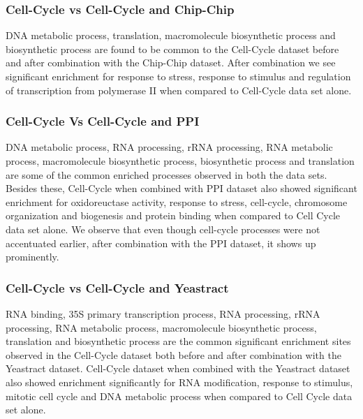 \subsubsection{Cell-Cycle vs Cell-Cycle and Chip-Chip}

DNA metabolic process, translation, macromolecule biosynthetic process and biosynthetic process are found to be common to the Cell-Cycle dataset before and after combination with the 
Chip-Chip dataset. After combination we see significant enrichment for response to stress, response to stimulus and regulation of transcription from polymerase II when compared 
to Cell-Cycle data set alone.

\subsubsection{Cell-Cycle Vs Cell-Cycle and PPI}

DNA metabolic process, RNA processing, rRNA processing, RNA metabolic process, macromolecule biosynthetic process, biosynthetic process and translation are 
some of the common enriched processes observed in both the data sets. Besides these, Cell-Cycle when combined with PPI dataset also showed significant enrichment for 
oxidoreuctase activity, response to stress, cell-cycle, chromosome organization and biogenesis and protein binding when compared to Cell Cycle data set alone. We observe that even though
cell-cycle processes were not accentuated earlier, after combination with the PPI dataset, it shows up prominently. 

\subsubsection{Cell-Cycle vs Cell-Cycle and Yeastract}

RNA binding, 35S primary transcription process, RNA processing, rRNA processing, RNA metabolic process, macromolecule biosynthetic process, 
translation and biosynthetic process are the common significant enrichment sites observed in the Cell-Cycle dataset both before and after combination with the Yeastract dataset. 
Cell-Cycle dataset when combined with the Yeastract dataset also showed enrichment significantly for RNA modification, response to stimulus, mitotic cell cycle 
and DNA metabolic process when compared to Cell Cycle data set alone. 


